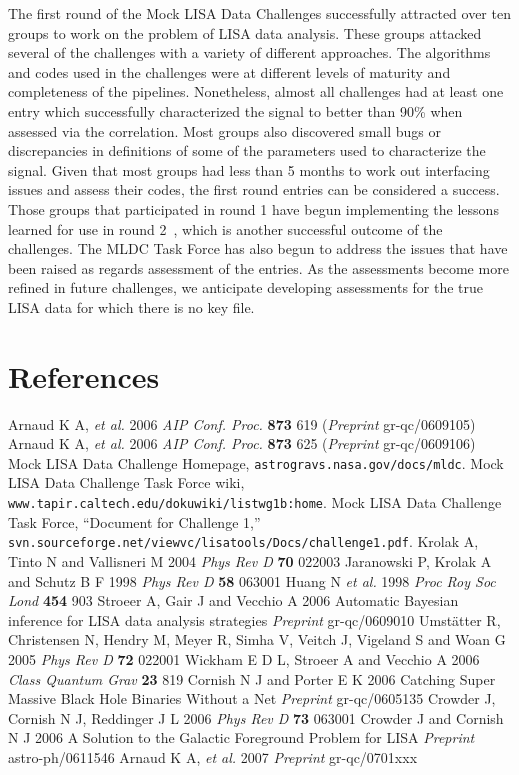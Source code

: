 \documentclass[12pt]{iopart}
\begin{document}
The first round of the Mock LISA Data Challenges successfully attracted over ten groups to work on the problem of LISA data analysis. These groups attacked several of the challenges with a variety of different approaches. The algorithms and codes used in the challenges were at different levels of maturity and completeness of the pipelines. Nonetheless, almost all challenges had at least one entry which successfully characterized the signal to better than 90\% when assessed via the correlation. Most groups also discovered small bugs or discrepancies in definitions of some of the parameters used to characterize the signal. Given that most groups had less than 5 months to work out interfacing issues and assess their codes, the first round entries can be considered a success. Those groups that participated in round 1 have begun implementing the lessons learned for use in round 2~\cite{MLDC2doc}, which is another successful outcome of the challenges. The MLDC Task Force has also begun to address the issues that have been raised as regards assessment of the entries. As the assessments become more refined in future challenges, we anticipate developing assessments for the true LISA data for which there is no key file.


\section*{References}
\begin{thebibliography}{10}
 Arnaud K A, {\it et al.} 2006 {\it AIP Conf. Proc.} {\bf 873} 619 ({\it Preprint} gr-qc/0609105)
 Arnaud K A, {\it et al.} 2006 {\it AIP Conf. Proc.} {\bf 873} 625 ({\it Preprint} gr-qc/0609106)
 Mock LISA Data Challenge Homepage, {\tt astrogravs.nasa.gov/docs/mldc}.
 Mock LISA Data Challenge Task Force wiki, {\tt www.tapir.caltech.edu/dokuwiki/listwg1b:home}.
 Mock LISA Data Challenge Task Force, ``Document for Challenge 1,'' {\tt svn.sourceforge.net/viewvc/lisatools/Docs/challenge1.pdf}.
 Krolak A, Tinto N and Vallisneri M 2004 {\it Phys Rev D} {\bf 70} 022003
 Jaranowski P, Krolak A and Schutz B F 1998 {\it Phys Rev D} {\bf 58} 063001
 Huang N {\it et al.} 1998 {\it Proc Roy Soc Lond} {\bf 454} 903
 Stroeer A, Gair J and Vecchio A 2006 Automatic Bayesian inference for LISA data analysis strategies {\it Preprint} gr-qc/0609010
 Umst\"{a}tter R, Christensen N, Hendry M, Meyer R, Simha V, Veitch J, Vigeland S and Woan G 2005 {\it Phys Rev D} {\bf 72} 022001
 Wickham E D L, Stroeer A and Vecchio A 2006 {\it Class Quantum Grav} {\bf 23} 819
 Cornish N J and Porter E K 2006 Catching Super Massive Black Hole Binaries Without a Net {\it Preprint} gr-qc/0605135
 Crowder J, Cornish N J, Reddinger J L 2006 {\it Phys Rev D} {\bf 73} 063001
 Crowder J and Cornish N J 2006 A Solution to the Galactic Foreground Problem for LISA {\it Preprint} astro-ph/0611546
 Arnaud K A, {\it et al.} 2007 {\it Preprint} gr-qc/0701xxx

\end{thebibliography}
\end{document}
